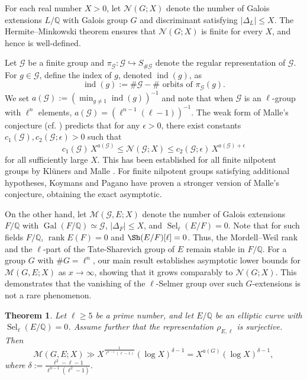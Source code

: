 \documentclass[11pt,reqno]{amsart}
\newtheorem{theorem}{Theorem}[section]
\newcommand{\cG}{\mathcal{G}}
\newcommand{\Q}{\mathbb{Q}}
\newcommand{\op}[1]{\operatorname{#1}}
\numberwithin{equation}{section}
\begin{document}
For each real number \( X > 0 \), let \( \mathcal{N}(G; X) \) denote the number of Galois extensions \( L/\Q \) with Galois group \( G \) and discriminant satisfying \( |\Delta_L| \leq X \). The Hermite{--}Minkowski theorem ensures that \( \mathcal{N}(G; X) \) is finite for every \( X \), and hence is well-defined.

Let $\cG$ be a finite group and \( \pi_\cG : \cG \hookrightarrow S_{\#\cG} \) denote the regular representation of \( \cG \). For \( g \in \cG \), define the index of \( g \), denoted \( \operatorname{ind}(g) \), as
\[
\operatorname{ind}(g) := \#\cG - \#\text{ orbits of } \pi_\cG(g).
\]
We set $a(\cG) := \left( \min_{g \neq 1} \operatorname{ind}(g) \right)^{-1}$ and note that when $\cG$ is an $\ell$-group with $\ell^n$ elements, $a(\cG)= \left( \ell^{n-1}(\ell - 1) \right)^{-1}$. The weak form of Malle's conjecture (cf. \cite[p.316]{Malle1}) predicts that for any \( \epsilon > 0 \), there exist constants \( c_1(\cG), c_2(\cG; \epsilon) > 0 \) such that
\[
c_1(\cG)\, X^{a(\cG)} \leq \mathcal{N}(\cG; X) \leq c_2(\cG; \epsilon)\, X^{a(\cG) + \epsilon}
\]
for all sufficiently large \( X \). This has been established for all finite nilpotent groups by Kl\"uners and Malle \cite{klunersmalle}. For finite nilpotent groups satisfying additional hypotheses, Koymans and Pagano \cite{koymans2023malle} have proven a stronger version of Malle's conjecture, obtaining the exact asymptotic.

On the other hand, let \( \mathcal{M}(\cG, E; X) \) denote the number of Galois extensions \( F/\Q \) with \( \operatorname{Gal}(F/\Q) \simeq \cG \), \( |\Delta_F| \leq X \), and \( \operatorname{Sel}_\ell(E/F) = 0 \). Note that for such fields $F/\Q$, $\op{rank}E(F)=0$ and $\Sh(E/F)[\ell]=0$. Thus, the Mordell--Weil rank and the $\ell$-part of the Tate-Sharevich group of $E$ remain stable in $F/\Q$. For a group $G$ with $\# G=\ell^n$, our main result establishes asymptotic lower bounds for \( \mathcal{M}(G, E; X) \) as \( x \to \infty \), showing that it grows comparably to \( \mathcal{N}(G; X) \). This demonstrates that the vanishing of the \( \ell \)-Selmer group over such \( G \)-extensions is not a rare phenomenon.

\begin{theorem}\label{main thm of section 4}
Let \( \ell \geq 5 \) be a prime number, and let \( E/\Q \) be an elliptic curve with \( \operatorname{Sel}_\ell(E/\Q) = 0 \). Assume further that the representation \( \rho_{E,\ell} \) is surjective. Then
\[
\mathcal{M}(G, E; X) \gg X^{\frac{1}{\ell^{n-1}(\ell - 1)}} (\log X)^{\delta - 1} = X^{a(G)} (\log X)^{\delta - 1},
\]
where \( \delta := \frac{\ell^2 - \ell - 1}{\ell^{n-1}(\ell^2 - 1)} \).
\end{theorem}
\end{document}
